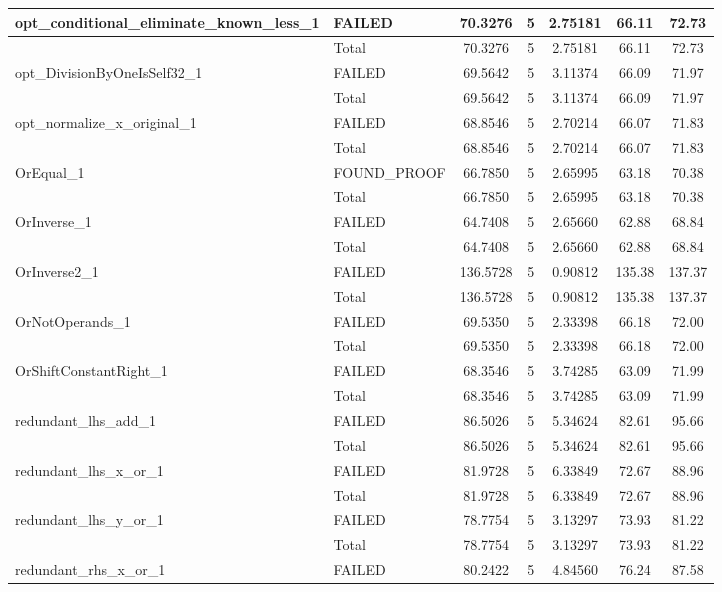 \begin{appendices}
\begin{longtable}{L{0.25\textwidth} L{0.2\textwidth}  c  c  c  c  c }
    opt\_conditional\_eliminate\_known\_less\_1 & FAILED & 70.3276 & 5 & 2.75181 & 66.11 & 72.73 \\ \midrule 
    & Total & 70.3276 & 5 & 2.75181 & 66.11 & 72.73 \\ \midrule 
    opt\_DivisionByOneIsSelf32\_1 & FAILED & 69.5642 & 5 & 3.11374 & 66.09 & 71.97 \\ \midrule 
    & Total & 69.5642 & 5 & 3.11374 & 66.09 & 71.97 \\ \midrule 
    opt\_normalize\_x\_original\_1 & FAILED & 68.8546 & 5 & 2.70214 & 66.07 & 71.83 \\ \midrule 
    & Total & 68.8546 & 5 & 2.70214 & 66.07 & 71.83 \\ \midrule 
    OrEqual\_1 & FOUND\_PROOF & 66.7850 & 5 & 2.65995 & 63.18 & 70.38 \\ \midrule 
    & Total & 66.7850 & 5 & 2.65995 & 63.18 & 70.38 \\ \midrule 
    OrInverse\_1 & FAILED & 64.7408 & 5 & 2.65660 & 62.88 & 68.84 \\ \midrule 
    & Total & 64.7408 & 5 & 2.65660 & 62.88 & 68.84 \\ \midrule 
    OrInverse2\_1 & FAILED & 136.5728 & 5 & 0.90812 & 135.38 & 137.37 \\ \midrule 
    & Total & 136.5728 & 5 & 0.90812 & 135.38 & 137.37 \\ \midrule 
    OrNotOperands\_1 & FAILED & 69.5350 & 5 & 2.33398 & 66.18 & 72.00 \\ \midrule 
    & Total & 69.5350 & 5 & 2.33398 & 66.18 & 72.00 \\ \midrule 
    OrShiftConstantRight\_1 & FAILED & 68.3546 & 5 & 3.74285 & 63.09 & 71.99 \\ \midrule 
    & Total & 68.3546 & 5 & 3.74285 & 63.09 & 71.99 \\ \midrule 
    redundant\_lhs\_add\_1 & FAILED & 86.5026 & 5 & 5.34624 & 82.61 & 95.66 \\ \midrule 
    & Total & 86.5026 & 5 & 5.34624 & 82.61 & 95.66 \\ \midrule 
    redundant\_lhs\_x\_or\_1 & FAILED & 81.9728 & 5 & 6.33849 & 72.67 & 88.96 \\ \midrule 
    & Total & 81.9728 & 5 & 6.33849 & 72.67 & 88.96 \\ \midrule 
    redundant\_lhs\_y\_or\_1 & FAILED & 78.7754 & 5 & 3.13297 & 73.93 & 81.22 \\ \midrule 
    & Total & 78.7754 & 5 & 3.13297 & 73.93 & 81.22 \\ \midrule 
    redundant\_rhs\_x\_or\_1 & FAILED & 80.2422 & 5 & 4.84560 & 76.24 & 87.58 \\ \midrule 

\end{longtable}
\end{appendices}
